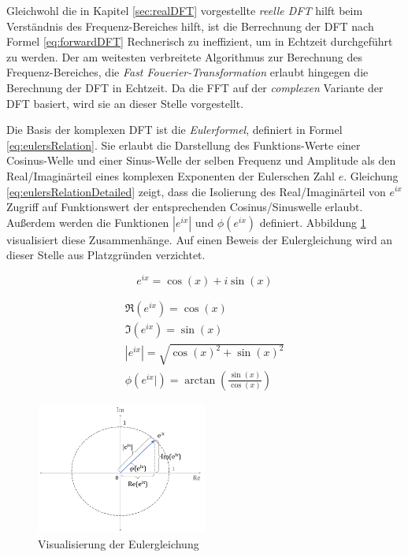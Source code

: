 Gleichwohl die in Kapitel \ref{sec:realDFT} vorgestellte \emph{reelle DFT} hilft beim Verständnis des Frequenz-Bereiches hilft, ist die Berrechnung der DFT nach Formel \ref{eq:forwardDFT} Rechnerisch zu ineffizient, um in Echtzeit durchgeführt zu werden. Der am weitesten verbreitete Algorithmus zur Berechnung des Frequenz-Bereiches, die \emph{Fast Fouerier-Transformation} erlaubt hingegen die Berechnung der DFT in Echtzeit. Da die FFT auf der \emph{complexen} Variante der DFT basiert, wird sie an dieser Stelle vorgestellt. \cite[S. 225]{dspGuide}

Die Basis der komplexen DFT ist die \emph{Eulerformel}, definiert in Formel \ref{eq:eulersRelation}. Sie erlaubt die Darstellung des Funktions-Werte einer Cosinus-Welle und einer Sinus-Welle der selben Frequenz und Amplitude als den Real/Imaginärteil eines komplexen Exponenten der Eulerschen Zahl $e$. Gleichung \ref{eq:eulersRelationDetailed} zeigt, dass die Isolierung des Real/Imaginärteil von $e^{ix}$ Zugriff auf Funktionswert der entsprechenden Cosinus/Sinuswelle erlaubt. Außerdem werden die Funktionen $|e^{ix}|$ und $\phi(e^{ix})$ definiert. Abbildung \ref{img:eulersRelation} visualisiert diese Zusammenhänge. Auf einen Beweis der Eulergleichung wird an dieser Stelle aus Platzgründen verzichtet. \cite[S. 569]{dspGuide}

\begin{equation}
e^{ix} = \cos(x) + i\sin(x)
\label{eq:eulersRelation}
\end{equation}

\begin{equation}
\begin{gathered}
\Re(e^{ix}) = \cos(x) \\
\Im(e^{ix}) = \sin(x)  \\
|e^{ix}| = \sqrt{\cos(x)^2 + \sin(x)^2} \\
\phi (e^{ix}|) = \arctan (\frac{\sin(x)}{\cos(x)})
\end{gathered}
\label{eq:eulersRelationDetailed}
\end{equation}

\begin{figure}[h]
	\centering
	\includegraphics[width=0.5\textwidth]{bilder/eulersRelation02.png}
	\caption{Visualisierung der Eulergleichung}
	\label{img:eulersRelation}
\end{figure}

